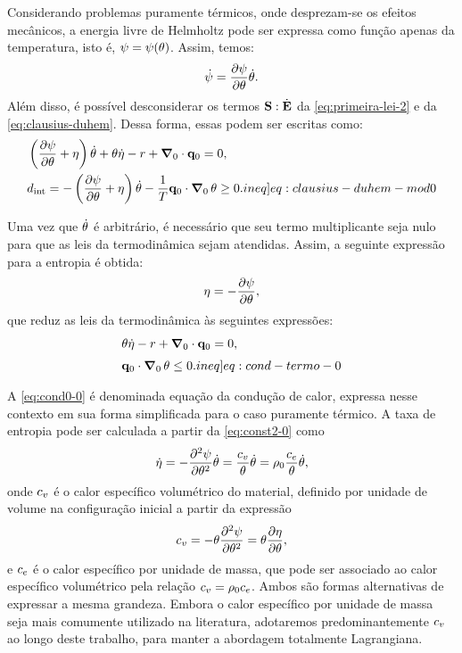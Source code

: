 \documentclass[Tese.tex]{subfiles}
\begin{document}
Considerando problemas puramente térmicos, onde desprezam-se os efeitos mecânicos, a energia livre de Helmholtz pode ser expressa como função apenas da temperatura, isto é, $\psi = \psi(\theta)$. Assim, temos:
\begin{equation}
\dot{\psi} = \dfrac{\partial\psi}{\partial\theta}\dot{\theta}.
\end{equation}
Além disso, é possível desconsiderar os termos $\mathbf{S}:\dot{\mathbf{E}}$ da \cref{eq:primeira-lei-2} e da  \cref{eq:clausius-duhem}. Dessa forma, essas podem ser escritas como:
\begin{align}
&\left(\dfrac{\partial \helmholtz}{\partial \temp} + {\entropy}\right)\dottemp  + \temp \dotentropy - \calorInt + \gradientei\cdot\qi = 0, \label{eq:primeira-lei-mod0} \\
&\dissipation = - \left(\dfrac{\partial \helmholtz}{\partial \temp} + {\entropy}\right)\dottemp - \dfrac{1}{T}\qi\cdot\gradientei\,\temp \geq 0. \label[ineq]{eq:clausius-duhem-mod0}
\end{align}

Uma vez que $\dot{\theta}$ é arbitrário, é necessário que seu termo multiplicante seja nulo para que as leis da termodinâmica sejam atendidas. Assim, a seguinte expressão para a entropia é obtida:
\begin{equation}
\eta=-\dfrac{\partial \psi}{\partial \theta},\label{eq:const2-0} 
\end{equation}
que reduz as leis da termodinâmica às seguintes expressões:
\begin{align}{ }
&
\temp \dotentropy - \calorInt + \gradientei\cdot\qi = 0, \label{eq:cond0-0}
\\[0.1cm]
&
\qi\cdot\gradientei\,\temp \leq 0. \label[ineq]{eq:cond-termo-0}
\end{align}

A \cref{eq:cond0-0} é denominada equação da condução de calor, expressa nesse contexto em sua forma simplificada para o caso puramente térmico. A taxa de entropia pode ser calculada a partir da \cref{eq:const2-0} como
\begin{equation}\label{eq:dotentropy-0}
\dot{\eta} = -\dfrac{\partial^2 \psi}{\partial \theta^2}\dot{\theta} = \dfrac{c_v}{\theta}\dot{\theta} = \rho_0\dfrac{c_e}{\theta}\dot{\theta},
\end{equation}
onde $c_v$ é o calor específico volumétrico do material, definido por unidade de volume na configuração inicial a partir da expressão
\begin{equation}\label{eq:specific-heat}
c_v = -\theta\dfrac{\partial^2 \psi}{\partial \theta^2} = \theta\dfrac{\partial\eta}{\partial\theta},
\end{equation}
e $c_e$ é o calor específico por unidade de massa, que pode ser associado ao calor específico volumétrico pela relação $c_v = \rho_0c_e$. Ambos são formas alternativas de expressar a mesma grandeza. Embora o calor específico por unidade de massa seja mais comumente utilizado na literatura, adotaremos predominantemente $c_v$ ao longo deste trabalho, para manter a abordagem totalmente Lagrangiana.
\end{document}

